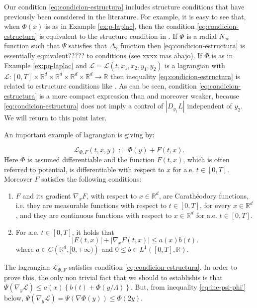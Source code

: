 \documentclass[twoside]{article}
\makeatletter
\theoremstyle{remark}
\newcommand{\labitem}[2]{%
\def\@itemlabel{#1}
\item
\def\@currentlabel{#1}\label{#2}}
\newcommand{\rr}{\mathbb{R}}
\renewcommand{\leq}{\leqslant}
\newcounter{example}[section]
\makeatother
\begin{document}
Our condition \eqref{eq:condicion-estructura} includes structure conditions that have previously been considered in the literature. For example, it is easy to see that, when $\Phi(x)$ is as in Example \ref{ex:p-laplac}, then  the condition \eqref{eq:condicion-estructura}  is equivalent to the structure condition in  \cite[Th. 1.4]{mawhin2010critical}.  If $\Phi$ is a radial $N_{\infty}$ function such that $\Psi$ satisfies that $\Delta_2$ function  then \eqref{eq:condicion-estructura} is essentially equivalent????? to conditions  \cite[Eq. (2)-(4)]{ABGMS2015} (see xxxx mas abajo).   If $\Phi$ is as in Example \ref{ex:pq-laplac} and $\mathcal{L}=\mathcal{L}(t,x_1,x_2,y_1,y_2)$ is a lagrangian with $\mathcal{L}:[0,T]\times\rr^d\times\rr^d\times\rr^d\times\rr^d\to\rr$ then inequality \eqref{eq:condicion-estructura} is related to estructure conditions like
\cite[Lemma 3.1, Eq. (3.1)]{Tian2007192}. As can be seen, condition \eqref{eq:condicion-estructura} is a more compact expression than \cite[Lemma 3.1, Eq. (3.1)]{Tian2007192} and moreover   weaker, because  \eqref{eq:condicion-estructura} does not imply a control of
$|D_{y_1}L|$ independent of $y_2$.  We will return to this point later.


An important example of lagrangian  is giving by:

\begin{equation}\label{eq:lagrange_phi}
\mathcal{L}_{\Phi,F}(t,x,y):=\Phi(y)+F(t,x).
\end{equation}
Here $\Phi$ is assumed differentiable and the function $F(t,x)$, which is often referred to potential,  is differentiable with respect to $x$ for a.e. $t\in [0,T]$. Moreover $F$ satisfies the following conditions:
\begin{enumerate}
\labitem{(C)}{item:condicion_c} $F$ and its gradient $\nabla_x F$, with respect to $x\in\rr^d$,  are  Carath\'eodory functions, i.e. they are measurable functions with respect to $t\in [0,T]$, for every  $x\in\rr^d$, and they are continuous functions with  respect to  $x\in\rr^d$ for a.e. $t \in [0,T]$.
 \labitem{(A)}{item:condicion_a}  For   a.e. $t\in [0,T]$, it holds that
\begin{equation}\label{eq:phi-lagrange}
|F(t,x)| + |\nabla_x F(t,x)|  \leq a(x)b(t).
\end{equation}
where  $a\in C\left(\rr^d,[0,+\infty)\right)$ and $0\leq b\in L^1([0,T],\rr)$.
\end{enumerate}

The lagrangian $\mathcal{L}_{\Phi,F}$ satisfies condition  \eqref{eq:condicion-estructura}. In order to prove this, the only non trivial fact that we should to establishis is that $ \Psi(\nabla_{y}\mathcal{L})
\leq
a(x)\left\{b(t)+ \Phi\left({y}/{\Lambda}\right)\right\}$. But, from inequality \eqref{eq:ine-psi-phi'} below, 
$\Psi(\nabla_{y}\mathcal{L})=\Psi\left(\nabla\Phi(y)\right)\leq \Phi(2y)$.
\end{document}
